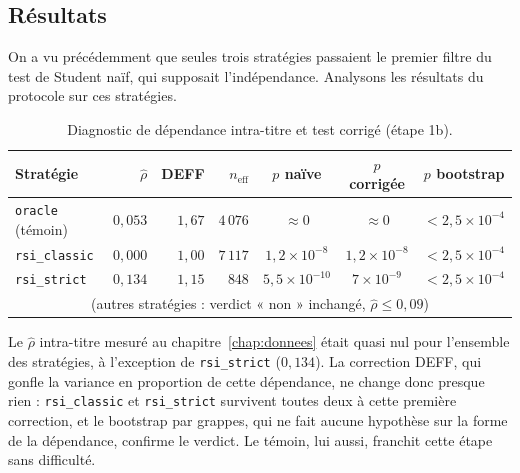 \subsection{Résultats}

On a vu précédemment que seules trois stratégies passaient le premier filtre
du test de Student naïf, qui supposait l'indépendance. Analysons les résultats
du protocole sur ces stratégies.

\begin{table}[H]
\centering
\caption{Diagnostic de dépendance intra-titre et test corrigé (étape 1b).}
\label{tab:b1-dep-deff}
\small
\begin{tabular}{@{}lrrrccc@{}}
\toprule
Stratégie & $\hat\rho$ & DEFF & $n_{\text{eff}}$ & $p$ naïve & $p$ corrigée & $p$ bootstrap \\
\midrule
\texttt{oracle} (témoin) & $0{,}053$ & $1{,}67$ & $4\,076$ & $\approx 0$ & $\approx 0$ & $<2{,}5\times10^{-4}$ \\
\midrule
\texttt{rsi\_classic} & $0{,}000$ & $1{,}00$ & $7\,117$ & $1{,}2\times10^{-8}$ & $1{,}2\times10^{-8}$ & $<2{,}5\times10^{-4}$ \\
\texttt{rsi\_strict}  & $0{,}134$ & $1{,}15$ & $848$    & $5{,}5\times10^{-10}$ & $7\times10^{-9}$     & $<2{,}5\times10^{-4}$ \\
\multicolumn{7}{c}{\footnotesize (autres stratégies : verdict « non » inchangé, $\hat\rho \le 0{,}09$)} \\
\bottomrule
\end{tabular}
\end{table}

Le $\hat\rho$ intra-titre mesuré au chapitre~\ref{chap:donnees} était quasi nul
pour l'ensemble des stratégies, à l'exception de \texttt{rsi\_strict}
($0{,}134$). La correction DEFF, qui gonfle la variance en proportion de
cette dépendance, ne change donc presque rien : \texttt{rsi\_classic} et
\texttt{rsi\_strict} survivent toutes deux à cette première correction, et le
bootstrap par grappes, qui ne fait aucune hypothèse sur la forme de la
dépendance, confirme le verdict. Le témoin, lui aussi, franchit cette étape
sans difficulté.


